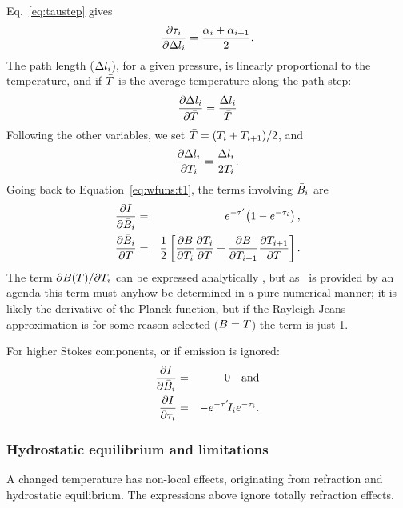 Eq.~\ref{eq:taustep} gives
\begin{equation}
  \frac{\partial \tau_{i}}{\partial \Delta l_{i}} = 
  \frac{{\alpha}_{i}+{\alpha}_{i+1}}{2}. 
\end{equation}
The path length ($\Delta l_{i}$), for a given pressure, is linearly
proportional to the temperature, and if $\bar{T}$ is the average temperature
along the path step:
\begin{equation}
  \frac{\partial \Delta l_{i}}{\partial \bar{T}} =   
                                    \frac{\Delta l_{i}}{\bar{T}} 
\end{equation}
Following the other variables, we set $\bar{T}=(T_{i}+T_{i+1})/2$, and
\begin{equation}
  \frac{\partial \Delta l_{i}}{\partial T_{i}} = 
                                    \frac{\Delta l_{i}}{2T_{i}}.
\end{equation}
Going back to Equation~\ref{eq:wfuns:t1}, the terms involving $\bar{B}_i$
are
\begin{eqnarray}
   \frac{\partial I}{\partial \bar{B}_i} &=&
   e^{-\tau'}\!\left(1-e^{-\tau_{i}}\right), \\
   \frac{\partial \bar{B}_i}{\partial T} &=& \frac{1}{2}\left[
    \frac{\partial B}{\partial T_{i}} \frac{\partial T_{i}}{\partial T} +
    \frac{\partial B}{\partial T_{i+1}} \frac{\partial T_{i+1}}{\partial T}
  \right].
\end{eqnarray}
The term $\partial B(T)/\partial T_{i}$ can be expressed analytically
\citep{eriksson:studi:02}, but as \Planck\ is provided by an agenda this term
must anyhow be determined in a pure numerical manner; it is likely the
derivative of the Planck function, but if the Rayleigh-Jeans approximation is
for some reason selected ($B=T$) the term is just 1.

For higher Stokes components, or if emission is ignored:
\begin{eqnarray}
   \frac{\partial I}{\partial \bar{B}_i} &=& 0 \quad \mathrm{and} \\
   \frac{\partial I}{\partial \tau_{i}}  &=& -e^{-\tau'}\!I_{i}e^{-\tau_{i}}.
\end{eqnarray}



\subsubsection{Hydrostatic equilibrium and limitations}
%
A changed temperature has non-local effects, originating from refraction and
hydrostatic equilibrium. The expressions above ignore totally refraction
effects. 

